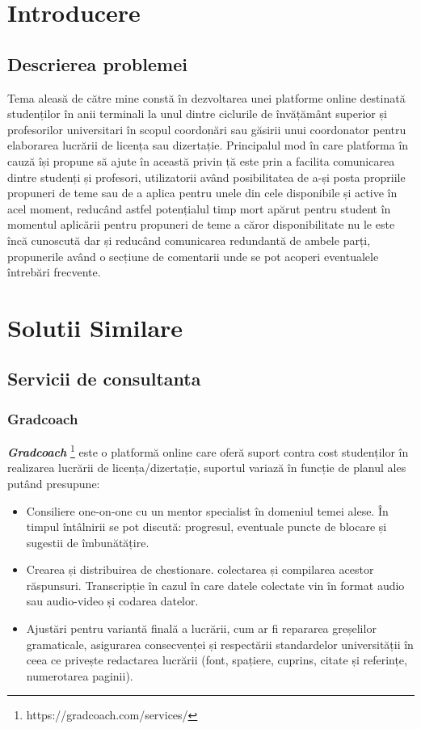 \documentclass[12pt,a4paper,hidelinks]{report}
\theoremstyle{definition}
\theoremstyle{remark}
\begin{document}
\tableofcontents
\newpage
\chapter{Introducere}

\section{Descrierea problemei}
Tema aleasă de către mine constă în dezvoltarea unei platforme online destinată studenților în anii terminali la unul dintre ciclurile de învățământ superior și profesorilor universitari în scopul coordonări sau găsirii unui coordonator pentru elaborarea lucrării de licența sau dizertație. Principalul mod în care platforma în cauză își propune să ajute în această privin
ță este prin a facilita comunicarea dintre studenți și profesori, utilizatorii având posibilitatea de a-și posta propriile propuneri de teme sau de a aplica pentru unele din cele disponibile și active în acel moment, reducând astfel potențialul timp mort apărut pentru student în momentul aplicării pentru propuneri de teme a căror disponibilitate nu le este încă cunoscută dar și reducând comunicarea redundantă de ambele parți, propunerile având o secțiune de comentarii unde se pot acoperi eventualele întrebări frecvente.
\chapter{Solutii Similare}
\section{Servicii de consultanta}
\subsection{Gradcoach}
\textbf{\textit{Gradcoach}} \footnote[1]{https://gradcoach.com/services/} este o platformă online care oferă suport contra cost studenților în realizarea lucrării de licența/dizertație, suportul variază în funcție de planul ales putând presupune:
\begin{itemize}
    \item Consiliere one-on-one cu un mentor specialist în domeniul temei alese. În timpul întâlnirii se pot discută: progresul, eventuale puncte de blocare și sugestii de îmbunătățire.
    \item Crearea și distribuirea de chestionare. colectarea și compilarea acestor răspunsuri. Transcripție în cazul în care datele colectate vin în format audio sau audio-video și codarea datelor.
    \item Ajustări pentru variantă finală a lucrării, cum ar fi repararea greșelilor gramaticale, asigurarea consecvenței și respectării standardelor universității în ceea ce privește redactarea lucrării (font, spațiere, cuprins, citate și referințe, numerotarea paginii).
\end{itemize}
\end{document}

